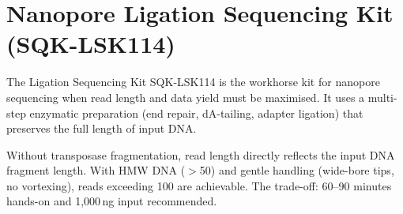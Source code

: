 \section{Nanopore Ligation Sequencing Kit (SQK-LSK114)}
\label{sec:protocols:lsk}

The Ligation Sequencing Kit SQK-LSK114 is the workhorse kit for nanopore sequencing when read length and data yield must be maximised. It uses a multi-step enzymatic preparation (end repair, dA-tailing, adapter ligation) that preserves the full length of input DNA.

\begin{keyconcept}[title={Ligation Libraries Preserve Read Length}]
Without transposase fragmentation, read length directly reflects the input DNA fragment length. With HMW DNA ($>$50\kilobase{}) and gentle handling (wide-bore tips, no vortexing), reads exceeding 100\kilobase{} are achievable. The trade-off: 60--90 minutes hands-on and 1,000\,ng input recommended.
\end{keyconcept}


